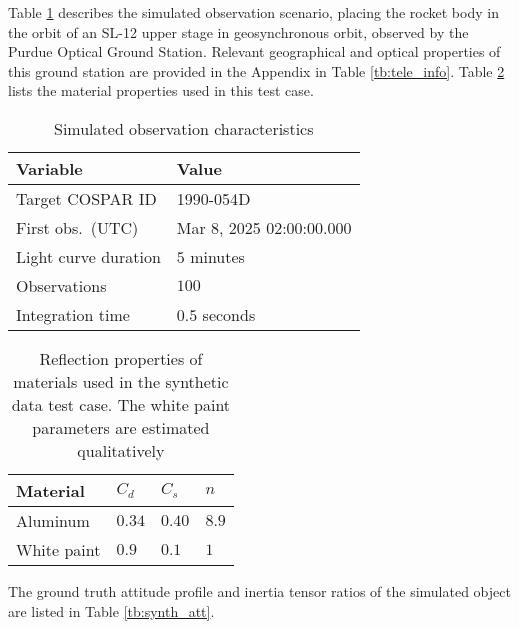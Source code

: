 \documentclass[a4paper,twocolumn]{spaceDebrisC} %
\begin{document}
Table \ref{tb:case1_in} describes the simulated observation scenario, placing the rocket body in the orbit of an SL-12 upper stage in geosynchronous orbit, observed by the Purdue Optical Ground Station. Relevant geographical and optical properties of this ground station are provided in the Appendix in Table \ref{tb:tele_info}. Table \ref{tb:synth_matprops} lists the material properties used in this test case.

\begin{table}[H]
  \centering
  \caption{Simulated observation characteristics}
  \vspace*{6pt}
  \begin{tabular}{|l|l|}
  \hline
  \textbf{Variable} & \textbf{Value} \\ \hline
 Target COSPAR ID & 1990-054D \\ \hline
 First obs.\ (UTC) & Mar 8, 2025 02:00:00.000 \\ \hline
 Light curve duration & $5$ minutes \\ \hline
 Observations & $100$ \\ \hline
 Integration time & $0.5$ seconds \\ \hline
  \end{tabular}
  \label{tb:case1_in}
\end{table}

\begin{table}[H]
  \centering
  \caption{Reflection properties of materials used in the synthetic data test case. The white paint parameters are estimated qualitatively}
  \vspace*{6pt}
  \begin{tabular}{|l|l|l|l|}
  \hline
  \textbf{Material} & $C_d$ & $C_s$ & $n$ \\ \hline
 Aluminum \cite{fankhauser2023} & $0.34$ & $0.40$ & $8.9$ \\ \hline
 White paint & $0.9$ & $0.1$ & $1$ \\ \hline
  \end{tabular}
  \label{tb:synth_matprops}
\end{table}

The ground truth attitude profile and inertia tensor ratios of the simulated object are listed in Table \ref{tb:synth_att}.
\end{document}
